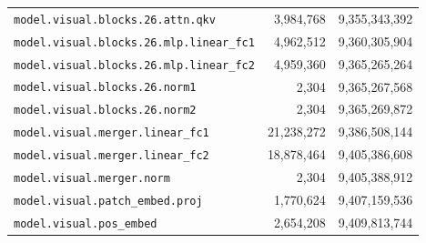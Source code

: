 \documentclass[10pt,a4paper]{article}
\theoremstyle{definition}
\begin{document}
\begin{appendices}
\begin{longtable}{p{9.5cm}rr}
\texttt{model.\allowbreak{}visual.\allowbreak{}blocks.\allowbreak{}26.\allowbreak{}attn.\allowbreak{}qkv} & 3,984,768 & 9,355,343,392 \\
\texttt{model.\allowbreak{}visual.\allowbreak{}blocks.\allowbreak{}26.\allowbreak{}mlp.\allowbreak{}linear\_fc1} & 4,962,512 & 9,360,305,904 \\
\texttt{model.\allowbreak{}visual.\allowbreak{}blocks.\allowbreak{}26.\allowbreak{}mlp.\allowbreak{}linear\_fc2} & 4,959,360 & 9,365,265,264 \\
\texttt{model.\allowbreak{}visual.\allowbreak{}blocks.\allowbreak{}26.\allowbreak{}norm1} & 2,304 & 9,365,267,568 \\
\texttt{model.\allowbreak{}visual.\allowbreak{}blocks.\allowbreak{}26.\allowbreak{}norm2} & 2,304 & 9,365,269,872 \\
\texttt{model.\allowbreak{}visual.\allowbreak{}merger.\allowbreak{}linear\_fc1} & 21,238,272 & 9,386,508,144 \\
\texttt{model.\allowbreak{}visual.\allowbreak{}merger.\allowbreak{}linear\_fc2} & 18,878,464 & 9,405,386,608 \\
\texttt{model.\allowbreak{}visual.\allowbreak{}merger.\allowbreak{}norm} & 2,304 & 9,405,388,912 \\
\texttt{model.\allowbreak{}visual.\allowbreak{}patch\_embed.\allowbreak{}proj} & 1,770,624 & 9,407,159,536 \\
\texttt{model.\allowbreak{}visual.\allowbreak{}pos\_embed} & 2,654,208 & 9,409,813,744 \\
\end{longtable}
\end{appendices}
\end{document}
